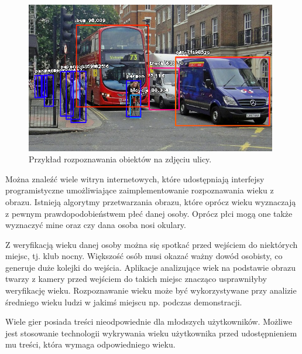 \documentclass[a4paper,twoside,12pt]{book}
\begin{document}
    \begin{figure}
        \centering
        \includegraphics[width=11cm]{Obrazy/rozpoznawanieObiektow.jpeg}
        \caption{Przykład rozpoznawania obiektów na zdjęciu ulicy.~\cite{rozpoznawanieObiektow}}
        \label{fig.rozpoznawanieObiektow}
    \end{figure}

    Można znaleźć wiele witryn internetowych, które udostępniają interfejsy programistyczne umożliwiające zaimplementowanie
    rozpoznawania wieku z obrazu.
    Istnieją algorytmy przetwarzania obrazu, które oprócz wieku wyznaczają z pewnym prawdopodobieństwem płeć danej osoby.
    Oprócz płci mogą one także wyznaczyć mine oraz czy dana osoba nosi okulary.

    Z weryfikacją wieku danej osoby można się spotkać przed wejściem do niektórych miejsc, tj.
    klub nocny.
    Większość osób
    musi okazać ważny dowód osobisty,
    co generuje duże kolejki do wejścia.
    Aplikacje analizujące wiek na podstawie obrazu twarzy z kamery przed wejściem
    do takich miejsc znacząco usprawniłyby weryfikację wieku.
    Rozpoznawanie wieku może być wykorzystywane przy analizie średniego wieku ludzi w jakimś miejscu np.
    podczas demonstracji.

    Wiele gier posiada treści nieodpowiednie dla młodszych użytkowników.
    Możliwe jest stosowanie technologii wykrywania
    wieku użytkownika przed udostępnieniem mu treści, która wymaga odpowiedniego wieku.
\end{document}
